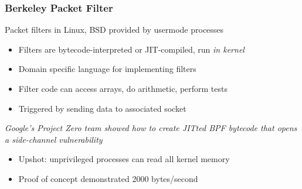 \documentclass[10pt,handout]{beamer}
\begin{document}

\begin{frame}

\frametitle{Berkeley Packet Filter}

Packet filters in Linux, BSD provided by usermode processes \pause
\begin{itemize}
  \item Filters are bytecode-interpreted or JIT-compiled, run \emph{in kernel}
  \item Domain specific language for implementing filters
  \item Filter code can access arrays, do arithmetic, perform tests
  \item Triggered by sending data to associated socket \\[1em]
\end{itemize}

\pause
\begin{center}
\emph{Google's Project Zero team showed how to create JITted BPF bytecode that opens a side-channel vulnerability}
\end{center}
\pause
\begin{itemize}
  \item Upshot: unprivileged processes can read all kernel memory
  \item Proof of concept demonstrated 2000 bytes/second
\end{itemize}

\end{frame}

\end{document}
